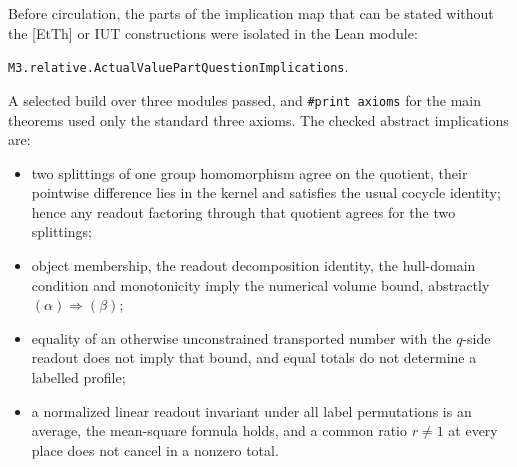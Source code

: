 \documentclass[11pt]{article}
\theoremstyle{definition}
\begin{document}
Before circulation, the parts of the implication map that can be
stated without the [EtTh] or IUT constructions were isolated in
the Lean module:
\begin{center}\small
\texttt{M3.relative.ActualValuePartQuestionImplications}.
\end{center}
A selected build over three modules passed, and
\texttt{\#print axioms} for the main theorems used only the
standard three axioms.  The checked abstract implications are:
\begin{itemize}[leftmargin=*]
\item two splittings of one group homomorphism agree on the
quotient, their pointwise difference lies in the kernel and
satisfies the usual cocycle identity; hence any readout factoring
through that quotient agrees for the two splittings;
\item object membership, the readout decomposition identity, the
hull-domain condition and monotonicity imply the numerical volume
bound, abstractly $(\alpha)\Rightarrow(\beta)$;
\item equality of an otherwise unconstrained transported number
with the $q$-side readout does not imply that bound, and equal
totals do not determine a labelled profile;
\item a normalized linear readout invariant under all label
permutations is an average, the mean-square formula holds, and a
common ratio $r\ne1$ at every place does not cancel in a nonzero
total.
\end{itemize}
\end{document}
